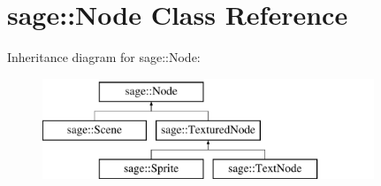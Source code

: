 \hypertarget{classsage_1_1Node}{}\section{sage\+::Node Class Reference}
\label{classsage_1_1Node}
Inheritance diagram for sage\+::Node\+:\begin{figure}[H]
\begin{center}
\leavevmode
\includegraphics[height=3.000000cm]{classsage_1_1Node}
\end{center}
\end{figure}
